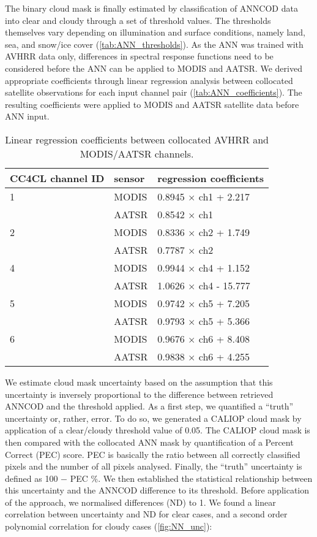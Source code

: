 The binary cloud mask is finally estimated by classification of ANNCOD data into clear and cloudy through a set of threshold values. The thresholds themselves vary depending on illumination and surface conditions, namely land, sea, and snow/ice cover (\autoref{tab:ANN_thresholds}). As the ANN was trained with AVHRR data only, differences in spectral response functions need to be considered before the ANN can be applied to MODIS and AATSR. We derived appropriate coefficients through linear regression analysis between collocated satellite observations for each input channel pair (\autoref{tab:ANN_coefficients}). The resulting coefficients were applied to MODIS and AATSR satellite data before ANN input.

\begin{table}[h]
  \caption{Linear regression coefficients between collocated AVHRR and MODIS/AATSR channels.}
  \begin{tabular}{l|l|l} %
    \hline
    CC4CL channel ID & sensor & regression coefficients \\    
    \hline
    1 & MODIS & 0.8945 $\times$ ch1 + 2.217 \\
      & AATSR & 0.8542 $\times$ ch1 \\ \hline
    2 & MODIS & 0.8336 $\times$ ch2 + 1.749 \\
      & AATSR & 0.7787 $\times$ ch2 \\ \hline
    4 & MODIS & 0.9944 $\times$ ch4 + 1.152 \\
      & AATSR & 1.0626 $\times$ ch4 - 15.777 \\ \hline
    5 & MODIS & 0.9742 $\times$ ch5 + 7.205 \\
      & AATSR & 0.9793 $\times$ ch5 + 5.366 \\ \hline
    6 & MODIS & 0.9676 $\times$ ch6 + 8.408 \\
      & AATSR & 0.9838 $\times$ ch6 + 4.255 \\
    \hline
  \end{tabular}
  \label{tab:ANN_coefficients}
\end{table}

We estimate cloud mask uncertainty based on the assumption that this uncertainty is inversely proportional to the difference between retrieved ANNCOD and the threshold applied. As a first step, we quantified a ``truth'' uncertainty or, rather, error. To do so, we generated a CALIOP cloud mask by application of a clear/cloudy threshold value of 0.05. The CALIOP cloud mask is then compared with the collocated ANN mask by quantification of a Percent Correct (PEC) score. PEC is basically the ratio between all correctly classified pixels and the number of all pixels analysed. Finally, the ``truth'' uncertainty is defined as 100 $-$ PEC \%. We then established the statistical relationship between this uncertainty and the ANNCOD difference to its threshold. Before application of the approach, we normalised differences (ND) to 1. We found a linear correlation between uncertainty and ND for clear cases, and a second order polynomial correlation for cloudy cases (\autoref{fig:NN_unc}):

